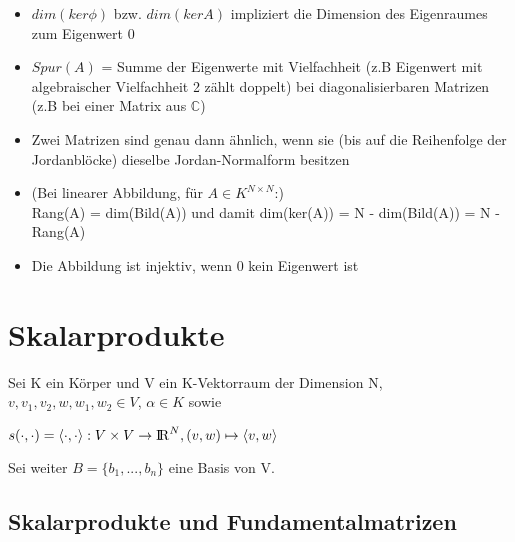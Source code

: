 \documentclass[10pt,a4paper]{article}
\def\realnumbers{{\rm I\!R}}
\def\complexnumbers{{\mathbb{C}}}
\begin{document}
	\begin{itemize}
		\item $dim(ker \phi)$ bzw. $dim(ker A)$ impliziert die Dimension des Eigenraumes zum Eigenwert 0
		\item $Spur(A)$ = Summe der Eigenwerte mit Vielfachheit (z.B Eigenwert mit algebraischer Vielfachheit 2 zählt doppelt) bei diagonalisierbaren Matrizen (z.B bei einer Matrix aus $\complexnumbers$)
		\item Zwei Matrizen sind genau dann ähnlich, wenn sie (bis auf die Reihenfolge der Jordanblöcke) dieselbe Jordan-Normalform besitzen
		\item (Bei linearer Abbildung, für $A \in K^{N\times N}$:)\\Rang(A) = dim(Bild(A)) und damit dim(ker(A)) = N - dim(Bild(A)) = N - Rang(A)
		\item Die Abbildung ist injektiv, wenn 0 kein Eigenwert ist
	\end{itemize}
	
	\newpage
	\section{Skalarprodukte}
	\label{sp:sec:skalarprodukte}
	
	Sei K ein Körper und V ein K-Vektorraum der Dimension N, $v, v_1, v_2, w, w_1, w_2 \in V$, $\alpha \in K$ sowie
	\begin{center}
		$s(\cdot,\cdot) = \langle\cdot,\cdot\rangle: V \times V \rightarrow \realnumbers^N, (v, w) \mapsto \langle v, w\rangle$
	\end{center}
	Sei weiter $B = \{b_1, ..., b_n\}$ eine Basis von V.
	
	\subsection{Skalarprodukte und Fundamentalmatrizen}
	\label{sp:sub:skalarprodukte_und_fundamentalmatrizen}
	
\end{document}

